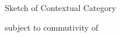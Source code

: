 


\begin{frame}{Sketch of Contextual Category}
\sketchgraph{\ncsar}
\pause 
\begin{block}{subject to commutivity of }
\vspace{0.25cm}
\studentProfessorDepartmentCommutingDiagrams{\ncsar}
\vspace{0.25cm}
\end{block}
\end{frame}


